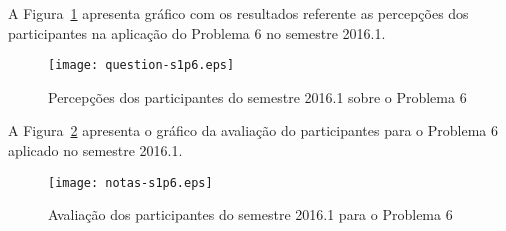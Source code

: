 A Figura~\ref{percep-s1p6} apresenta gráfico com os resultados referente
as percepções dos participantes na aplicação do
Problema 6 no semestre 2016.1.

\begin{figure}[!htb]
\centering
\texttt{[image: question-s1p6.eps]}
\caption{Percepções dos participantes do semestre 2016.1 sobre o Problema 6}
\label{percep-s1p6}
\end{figure}

A Figura~\ref{aval-s1p6} apresenta o gráfico da
avaliação do participantes para o Problema 6 aplicado no semestre 2016.1.

\begin{figure}[!htb]
\centering
\texttt{[image: notas-s1p6.eps]}
\caption{Avaliação dos participantes do semestre 2016.1 para o Problema 6}
\label{aval-s1p6}
\end{figure}
